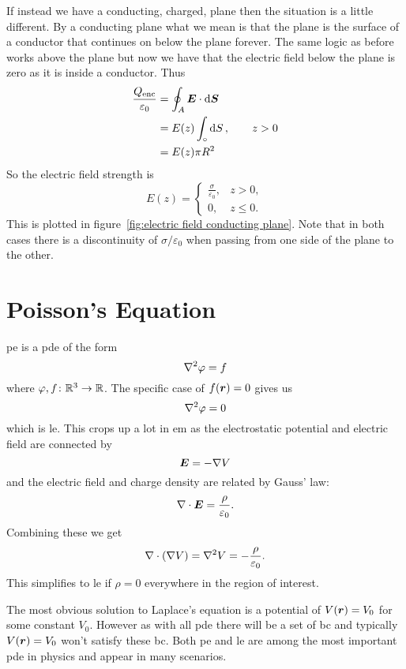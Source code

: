     If instead we have a conducting, charged, plane then the situation is a little different.
    By a conducting plane what we mean is that the plane is the surface of a conductor that continues on below the plane forever.
    The same logic as before works above the plane but now we have that the electric field below the plane is zero as it is inside a conductor.
    Thus
    \begin{align*}
        \frac{Q_\mathrm{enc}}{\varepsilon_0} &= \oint_A\bm{E}\cdot\dd{\bm{S}}\\
        &= E(z)\int_\circ \dd{S},\qquad z > 0\\
        &= E(z)\pi R^2\\
    \end{align*}
    So the electric field strength is
    \[
        E(z) = \begin{cases}
            \frac{\sigma}{\varepsilon_0}, & z > 0,\\
            0, & z \le 0.
        \end{cases}
    \]
    This is plotted in figure~\ref{fig:electric field conducting plane}.
    Note that in both cases there is a discontinuity of \(\sigma/\varepsilon_0\) when passing from one side of the plane to the other.
    
    \section{Poisson's Equation}
    \acrfull{pe} is a \acrfull{pde} of the form
    \[\nabla^2\varphi = f\]
    where \(\varphi, f\colon\mathbb{R}^3\to\mathbb{R}\).
    The specific case of \(f(\bm{r}) = 0\) gives us
    \[\nabla^2\varphi = 0\]
    which is \acrfull{le}.
    This crops up a lot in \acrshort{em} as the electrostatic potential and electric field are connected by
    \[\bm{E} = -\nabla V\]
    and the electric field and charge density are related by Gauss' law:
    \[\nabla\cdot\bm{E} = \frac{\rho}{\varepsilon_0}.\]
    Combining these we get
    \[\nabla\cdot(\nabla V) = \nabla^2 V = -\frac{\rho}{\varepsilon_0}.\]
    This simplifies to \acrshort{le} if \(\rho = 0\) everywhere in the region of interest.
    
    The most obvious solution to Laplace's equation is a potential of \(V(\bm{r}) = V_0\) for some constant \(V_0\).
    However as with all \acrshort{pde} there will be a set of \acrfull{bc} and typically \(V(\bm{r}) = V_0\) won't satisfy these \acrshort{bc}.
    Both \acrshort{pe} and \acrshort{le} are among the most important \acrshort{pde} in physics and appear in many scenarios.
    
